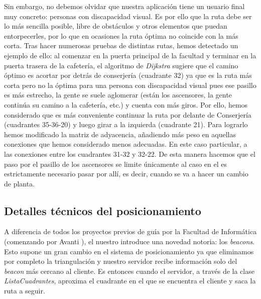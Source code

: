Sin embargo, no debemos olvidar que nuestra aplicación tiene un usuario final muy concreto: personas con discapacidad visual. Es por ello que la ruta debe ser lo más sencilla posible, libre de obstáculos y otros elementos que puedan entorpecerles, por lo que en ocasiones la ruta óptima no coincide con la más corta. Tras hacer numerosas pruebas de distintas rutas, hemos detectado un ejemplo de ello: al comenzar en la puerta principal de la facultad y terminar en la puerta trasera de la cafetería, el algoritmo de \textit{Dijkstra} sugiere que el camino óptimo es acortar por detrás de conserjería (cuadrante 32) ya que es la ruta más corta pero no la óptima para una persona con discapacidad visual pues ese pasillo es más estrecho, la gente se suele aglomerar (están los ascensores, la gente continúa su camino a la cafetería, etc.) y cuenta con más giros. Por ello, hemos considerado que es más conveniente continuar la ruta por delante de Conserjería (cuadrantes 35-36-20) y luego girar a la izquierda (cuadrante 21). Para lograrlo hemos modificado la matriz de adyacencia, añadiendo más peso en aquellas conexiones que hemos considerado menos adecuadas. En este caso particular, a las conexiones entre los cuadrantes 31-32 y 32-22. De esta manera hacemos que el paso por el pasillo de los ascensores se limite únicamente al caso en el es estrictamente necesario pasar por allí, es decir, cuando se va a hacer un cambio de planta.


\subsection{Detalles técnicos del posicionamiento}


A diferencia de todos los proyectos previos de guía por la Facultad de Informática (comenzando por Avanti \citep{avanti}), el nuestro introduce una novedad notoria: los \textit{beacons}. Esto supone un gran cambio en el sistema de posicionamiento ya que eliminamos por completo la triangulación y nuestro servidor recibe información solo del \textit{beacon} más cercano al cliente. Es entonces cuando el servidor, a través de la clase \textit{ListaCuadrantes}, aproxima el cuadrante en el que se encuentra el cliente y saca la ruta a seguir.  %


